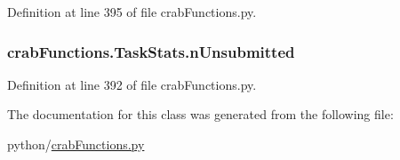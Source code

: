 Definition at line 395 of file crab\-Functions.\-py.

\subsubsection[{n\-Unsubmitted}]{\setlength{\rightskip}{0pt plus 5cm}crab\-Functions.\-Task\-Stats.\-n\-Unsubmitted}\label{classcrabFunctions_1_1TaskStats_a91781bd3f7db872c3e3b8f8dca88ad8c}


Definition at line 392 of file crab\-Functions.\-py.



The documentation for this class was generated from the following file\-:\begin{DoxyCompactItemize}
\item 
python/\hyperlink{crabFunctions_8py}{crab\-Functions.\-py}\end{DoxyCompactItemize}
